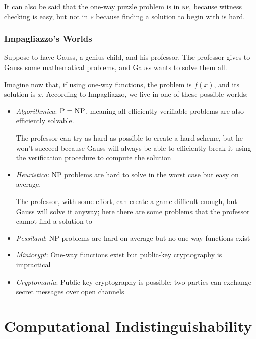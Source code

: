 It can also be said that the one-way puzzle problem is in \textsc{np}, because witness checking is easy, but not in \textsc{p} because finding a solution to begin with is hard.

\subsubsection{Impagliazzo's Worlds}

Suppose to have Gauss, a genius child, and his professor. The professor gives to Gauss some mathematical problems, and Gauss wants to solve them all.

Imagine now that, if using one-way functions, the problem is $f(x)$, and its solution is $x$. According to Impagliazzo, we live in one of these possible worlds:
\begin{itemize}
    \item \textit{Algorithmica}: $\textsc{P} = \textsc{NP}$, meaning all efficiently verifiable problems are also efficiently solvable. 
    
    The professor can try as hard as possible to create a hard scheme, but he won't succeed because Gauss will always be able to efficiently break it using the verification procedure to compute the solution

    \item \textit{Heuristica}: \textsc{NP} problems are hard to solve in the worst case but easy on average. 
    
    The professor, with some effort, can create a game difficult enough, but Gauss will solve it anyway; here there are some problems that the professor cannot find a solution to

    \item \textit{Pessiland}: \textsc{NP} problems are hard on average but no one-way functions exist
    
    \item \textit{Minicrypt}: One-way functions exist but public-key cryptography is impractical
    
    \item \textit{Cryptomania}: Public-key cryptography is possible: two parties can exchange secret messages over open channels
\end{itemize}
    
\section{Computational Indistinguishability}

